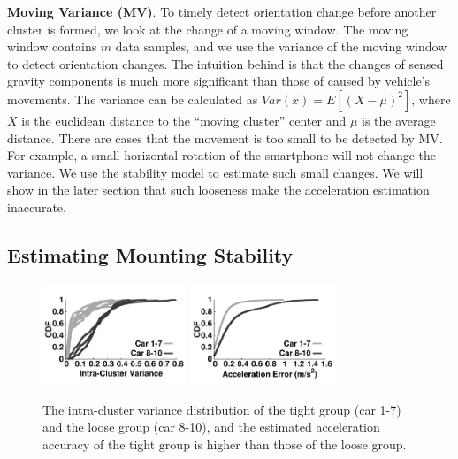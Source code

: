 \textbf{Moving Variance (MV)}. To timely detect orientation change before
another cluster is formed, 
we look at the change of a moving window.
The moving window contains $m$ data samples, 
and we use the variance of the moving window to detect
orientation changes. 
The intuition behind is that the changes of sensed gravity components 
is much more significant than those of caused by vehicle's movements. 
The variance can be calculated as $Var(x) = E[(X - \mu)^2]$, 
where $X$ is the euclidean distance to the ``moving cluster''
center and $\mu$ is the average distance. 
There are cases that the movement is too small to be detected
by MV. 
For example, a small horizontal rotation of the smartphone will not 
change the variance. 
We use the stability model to estimate such small changes. 
We will show in the later section that such looseness
make the acceleration estimation inaccurate. 
 
 
\subsection{Estimating Mounting Stability}



\begin{figure}[!htbp]
\begin{center}
\includegraphics[width=1.7in,angle=0]{Figs/DriveSense/variance_cars.pdf}
\hspace{-0.5cm}
\includegraphics[width=1.7in,angle=0]{Figs/DriveSense/sensor_error_cars.pdf}
\vspace{-0.2cm}
\caption{The intra-cluster variance distribution of the tight group (car 1-7)
	and the loose group (car 8-10), and 
the estimated acceleration accuracy of the tight group is higher than those
	of the loose group.}
\vspace{-0.2cm}
\label{mounting}
\end{center}
\end{figure}


